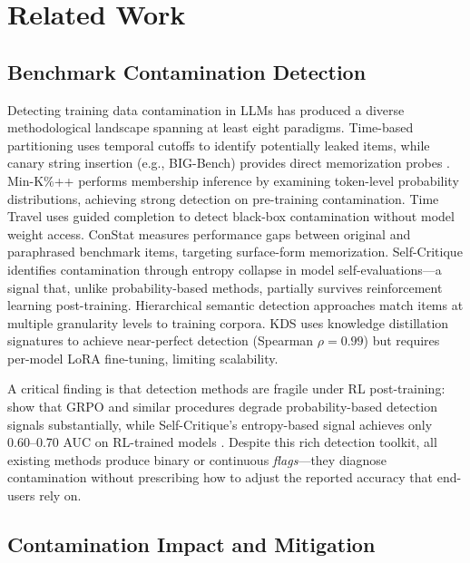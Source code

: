 \section{Related Work}
\label{sec:related}

\subsection{Benchmark Contamination Detection}
\label{sec:related:detection}

Detecting training data contamination in LLMs has produced a diverse methodological landscape spanning at least eight paradigms. Time-based partitioning uses temporal cutoffs to identify potentially leaked items, while canary string insertion (e.g., BIG-Bench) provides direct memorization probes \citep{chang2025benchmarking}. Min-K\%++ \citep{duan2025minkpp} performs membership inference by examining token-level probability distributions, achieving strong detection on pre-training contamination. Time Travel \citep{oren2024proving} uses guided completion to detect black-box contamination without model weight access. ConStat \citep{dekoninck2024constat} measures performance gaps between original and paraphrased benchmark items, targeting surface-form memorization. Self-Critique \citep{wust2025selfcritique} identifies contamination through entropy collapse in model self-evaluations---a signal that, unlike probability-based methods, partially survives reinforcement learning post-training. Hierarchical semantic detection approaches match items at multiple granularity levels to training corpora. KDS \citep{xu2025kds} uses knowledge distillation signatures to achieve near-perfect detection (Spearman $\rho = 0.99$) but requires per-model LoRA fine-tuning, limiting scalability.

A critical finding is that detection methods are fragile under RL post-training: \citet{wang2025fragility} show that GRPO and similar procedures degrade probability-based detection signals substantially, while Self-Critique's entropy-based signal achieves only 0.60--0.70 AUC on RL-trained models \citep{wust2025selfcritique}. Despite this rich detection toolkit, all existing methods produce binary or continuous \emph{flags}---they diagnose contamination without prescribing how to adjust the reported accuracy that end-users rely on.

\subsection{Contamination Impact and Mitigation}
\label{sec:related:mitigation}

